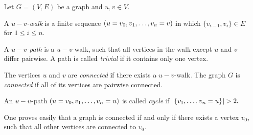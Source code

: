 \begin{defin}
Let $G=(V,E)$ be a graph and $u,v\in V$.
\begin{thmlist}
\item A \emph{$u-v$-walk} is a finite sequence $(u=v_0,v_{1},\ldots,v_{n}=v)$ in which $\lbrace v_{i-1},v_i\rbrace\in E$ for $1\leq i\leq n$.
\item A \emph{$u-v$-path} is a $u-v$-walk, such that all vertices in the walk except $u$ and $v$ differ pairwise. A path is called \emph{trivial} if it contains only one vertex.
\item The vertices $u$ and $v$ are \textit{connected} if there exists a $u-v$-walk. The graph $G$ is \emph{connected} if all of its vertices are pairwise connected.
\item An $u-u$-path $(u=v_0,v_{1},\ldots,v_{n}=u)$ is called \emph{cycle} if $|\lbrace\seq{v}=u\rbrace|>2.$
\end{thmlist}
\end{defin}

\begin{rem}
One proves easily that a graph is connected if and only if there exists a vertex $v_0$, such that all other vertices are connected to $v_0$.
\end{rem}

